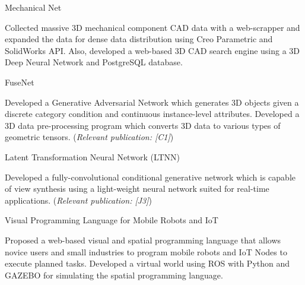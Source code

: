 


\begin{cventries}

\cvpub
{Mechanical Net} %
{ %
\begin{cvitems}
\item {Collected massive 3D mechanical component CAD data with a web-scrapper and expanded the data for dense data distribution using Creo Parametric and SolidWorks API. Also, developed a web-based 3D CAD search engine using a 3D Deep Neural Network and PostgreSQL database.}
\end{cvitems}
}

\cvpub
{FuseNet} %
{ %
\begin{cvitems}
\item {Developed a Generative Adversarial Network which generates 3D objects given a discrete category condition and continuous instance-level attributes. Developed a 3D data pre-processing program which converts 3D data to various types of geometric tensors. (\textit{Relevant publication: [C1]})}
\end{cvitems}
}


\cvpub
{Latent Transformation Neural Network (LTNN)} %
{ %
\begin{cvitems}
\item {Developed a fully-convolutional conditional generative network which is capable of view synthesis using a light-weight neural network suited for real-time applications. (\textit{Relevant publication: [J3]})}
\end{cvitems}
}


\cvpub
{Visual Programming Language for Mobile Robots and IoT} %
{ %
\begin{cvitems}
\item {Proposed a web-based visual and spatial programming language that allows novice users and small industries to program mobile robots and IoT Nodes to execute planned tasks. Developed a virtual world using ROS with Python and GAZEBO for simulating the spatial programming language.}
\end{cvitems} 
}


\end{cventries}
